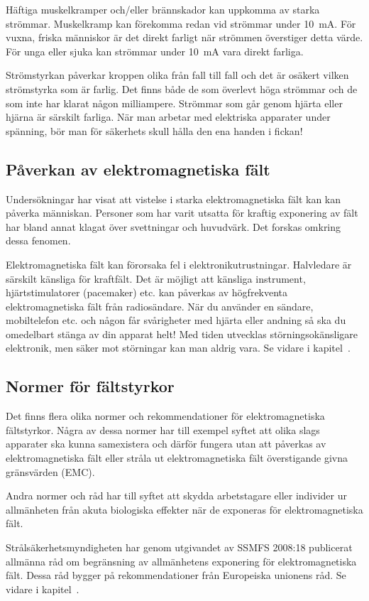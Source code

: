 \vspace{1ex}
Häftiga muskelkramper och/eller brännskador kan uppkomma av starka strömmar.
Muskelkramp kan förekomma redan vid strömmar under \qty{10}{\milli\ampere}.
För vuxna, friska människor är det direkt farligt när strömmen överstiger
detta värde.
För unga eller sjuka kan strömmar under \qty{10}{\milli\ampere} vara direkt
farliga.

Strömstyrkan påverkar kroppen olika från fall till fall och det är osäkert
vilken strömstyrka som är farlig.
Det finns både de som överlevt höga strömmar och de som inte har klarat någon
milliampere.
Strömmar som går genom hjärta eller hjärna är särskilt farliga.
När man arbetar med elektriska apparater under spänning, bör man för säkerhets
skull hålla den ena handen i fickan!

\subsection{Påverkan av elektromagnetiska fält}

Undersökningar har visat att vistelse i starka elektromagnetiska fält
kan kan påverka människan.
Personer som har varit utsatta för kraftig exponering av fält har bland annat
klagat över svettningar och huvudvärk.
Det forskas omkring dessa fenomen.

Elektromagnetiska fält kan förorsaka fel i elektronikutrustningar.
Halvledare är särskilt känsliga för kraftfält.
Det är möjligt att känsliga instrument, hjärtstimulatorer (pacemaker) etc. kan
påverkas av högfrekventa elektromagnetiska fält från radiosändare.
När du använder en sändare, mobiltelefon etc. och någon får svårigheter med
hjärta eller andning så ska du omedelbart stänga av din apparat helt!
Med tiden utvecklas störningsokänsligare elektronik, men säker mot störningar
kan man aldrig vara. Se vidare i kapitel~.

\subsection{Normer för fältstyrkor}

Det finns flera olika normer och rekommendationer för elektromagnetiska
fältstyrkor. Några av dessa normer har till exempel syftet att olika slags
apparater ska kunna samexistera och därför fungera utan att påverkas av
elektromagnetiska fält eller stråla ut elektromagnetiska fält överstigande
givna gränsvärden (EMC).

Andra normer och råd har till syftet att skydda arbetstagare eller individer
ur allmänheten från akuta biologiska effekter när de exponeras för
elektromagnetiska fält.

Strålsäkerhetsmyndigheten har genom utgivandet av SSMFS 2008:18 publicerat
allmänna råd om begränsning av allmänhetens exponering för elektromagnetiska
fält.
Dessa råd bygger på rekommendationer från Europeiska unionens råd.
Se vidare i kapitel~.
